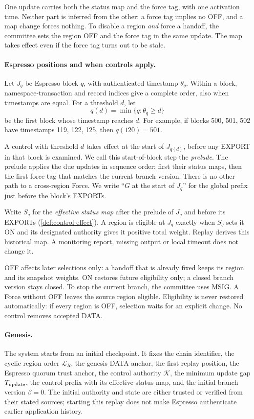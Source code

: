 \documentclass[11pt,a4paper]{article}
\newcommand{\defterm}[1]{\textcolor{rrBlue}{\textit{#1}}}
\begin{document}
One update carries both the status map and the force tag, with one
activation time. Neither part is inferred from the other: a force tag
implies no OFF, and a map change forces nothing. To disable a region
\emph{and} force a handoff, the committee sets the region OFF and the
force tag in the same update. The map takes effect even if the force tag
turns out to be stale.

\paragraph{Espresso positions and when controls apply.}
Let $J_q$ be Espresso block $q$, with authenticated timestamp $\theta_q$.
Within a block, namespace-transaction and record indices give a complete
order, also when timestamps are equal. For a threshold $d$, let
\[
 q(d)=\min\{q:\theta_q\ge d\}
\]
be the first block whose timestamp reaches $d$. For example, if blocks
500, 501, 502 have timestamps 119, 122, 125, then $q(120)=501$.

A control with threshold $d$ takes effect at the start of $J_{q(d)}$,
before any EXPORT in that block is examined. We call this start-of-block
step the \defterm{prelude}. The prelude applies the due updates in
sequence order: first their status maps, then the first force tag that
matches the current branch version. There is no other path to a
cross-region Force. We write ``$G$ at the start of $J_q$'' for the global
prefix just before the block's EXPORTs.

Write $S_q$ for the \defterm{effective status map} after the prelude of
$J_q$ and before its EXPORTs (\cref{def:control-effect}). A region is
eligible at $J_q$ exactly when $S_q$ sets it ON and its designated
authority gives it positive total weight. Replay derives this historical
map. A monitoring
report, missing output or local timeout does not change it.

OFF affects later selections only: a handoff that is already fixed
keeps its region and its snapshot weights. ON restores future
eligibility only; a closed branch version stays closed. To stop
the current branch, the committee uses MSIG. A Force without OFF leaves
the source region eligible. Eligibility is never restored automatically:
if every region is OFF, selection waits for an explicit change. No
control removes accepted DATA.

\paragraph{Genesis.}
The system starts from an initial checkpoint. It fixes the chain
identifier, the cyclic region order $\mathcal L_R$, the genesis DATA
anchor, the first replay position, the Espresso quorum trust anchor,
the control authority $\mathcal K$, the minimum update gap
$T_{\rm update}$, the control prefix with its effective status map, and
the initial branch version $\beta=0$. The initial
authority and state are either trusted or verified from their stated
sources; starting this replay does not make Espresso authenticate
earlier application history.
\end{document}

